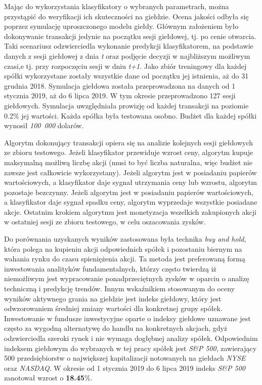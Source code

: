 \documentclass[a4paper, twoside, 11pt, openright]{article}
\begin{document}
Mając do wykorzystania klasyfikatory o wybranych parametrach, można przystąpić do weryfikacji ich skuteczności na giełdzie. Ocena jakości odbyła się poprzez symulację uproszczonego modelu giełdy. Głównym założeniem było dokonywanie transakcji jedynie na początku sesji giełdowej, tj. po cenie otwarcia. Taki scenariusz odzwierciedla wykonanie predykcji klasyfikatorem, na podstawie danych z sesji giełdowej z dnia \textit{t} oraz podjęcie decyzji w najbliższym możliwym czasi,e tj. przy rozpoczęciu sesji w dniu \textit{t+1}. Jako zbiór treningowy dla każdej spółki wykorzystane zostały wszystkie dane od początku jej istnienia, aż do 31 grudnia 2018. Symulacja giełdowa została przeprowadzona na danych od 1 stycznia 2019, aż do 6 lipca 2019. W tym okresie przeprowadzono 127 sesji giełdowych. Symulacja uwzględniała prowizję od każdej transakcji na poziomie 0.2\% jej wartości. Każda spółka była testowana osobno. Budżet dla każdej spółki wynosił \textit{100~000} dolarów.

\bigskip

Algorytm dokonujący transakcji opiera się na analizie kolejnych sesji giełdowych ze zbioru testowego. Jeżeli klasyfikator przewiduje wzrost ceny, algorytm kupuje maksymalną możliwą liczbę akcji (musi to być liczba naturalna, więc budżet nie zawsze jest całkowicie wykorzystany). Jeżeli algorytm jest w posiadaniu papierów wartościowych, a klasyfikator daje sygnał utrzymania ceny lub wzrostu, algorytm pozostaje bezczynny. Jeżeli algorytm jest w posiadaniu papierów wartościowych, a klasyfikator daje sygnał spadku ceny, algorytm wyprzedaje wszystkie posiadane akcje. Ostatnim krokiem algorytmu jest monetyzacja wszelkich zakupionych akcji w ostatniej sesji ze zbioru testowego, w celu oszacowania zysków.

\bigskip

Do porównania uzyskanych wyników zastosowana była technika \textit{buy and hold}, która polega na kupieniu akcji odpowiednich spółek i pozostaniu biernym na wahania rynku do czasu spieniężenia akcji. Ta metoda jest preferowaną formą inwestowania analityków fundamentalnych, którzy często twierdzą iż niemożliwym jest wypracowanie ponadprzeciętnych zysków w oparciu o analizę techniczną i predykcję trendów. Innym wskaźnikiem stosowanym do oceny wyników aktywnego grania na giełdzie jest indeks giełdowy, który jest odwzorowaniem średniej zmiany wartości dla konkretnej grupy spółek. Inwestowanie w fundusze inwestycyjne oparte o indeksy giełdowe uznawane jest często za wygodną alternatywę do handlu na konkretnych akcjach, gdyż odzwierciedla szeroki rynek i nie wymaga dogłębnej analizy spółek. Odpowiednim indeksem giełdowym do wybranych w tej pracy spółek jest \textit{S\&P 500}, zawierający 500 przedsiębiorstw o największej kapitalizacji notowanych na giełdach \textit{NYSE} oraz \textit{NASDAQ}. W okresie od 1 stycznia 2019 do 6 lipca 2019 indeks \textit{S\&P 500} zanotował wzrost o \textbf{18.45}\%.
\end{document}
